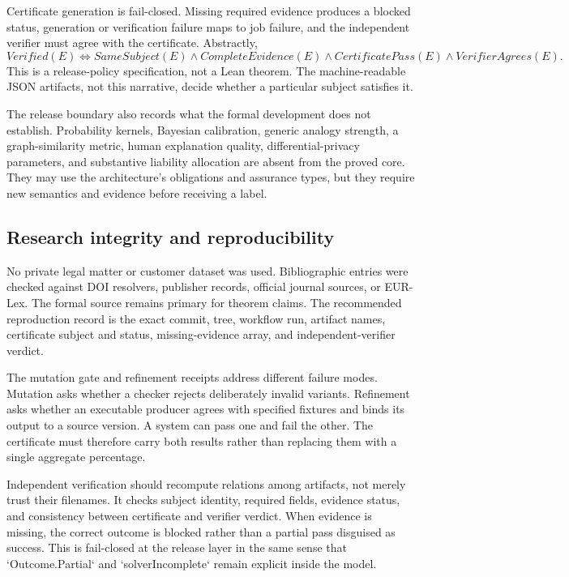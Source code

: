 Certificate generation is fail-closed. Missing required evidence produces a blocked status, generation or verification failure maps to job failure, and the independent verifier must agree with the certificate. Abstractly,
\begin{equation}
Verified(E)\iff SameSubject(E)\land CompleteEvidence(E)
\land CertificatePass(E)\land VerifierAgrees(E).
\label{eq:verified-release}
\end{equation}
This is a release-policy specification, not a Lean theorem. The machine-readable JSON artifacts, not this narrative, decide whether a particular subject satisfies it.

The release boundary also records what the formal development does not establish. Probability kernels, Bayesian calibration, generic analogy strength, a graph-similarity metric, human explanation quality, differential-privacy parameters, and substantive liability allocation are absent from the proved core. They may use the architecture's obligations and assurance types, but they require new semantics and evidence before receiving a \formalized{} label.

\subsection{Research integrity and reproducibility}

No private legal matter or customer dataset was used. Bibliographic entries were checked against DOI resolvers, publisher records, official journal sources, or EUR-Lex. The formal source remains primary for theorem claims. The recommended reproduction record is the exact commit, tree, workflow run, artifact names, certificate subject and status, missing-evidence array, and independent-verifier verdict.

The mutation gate and refinement receipts address different failure modes. Mutation asks whether a checker rejects deliberately invalid variants. Refinement asks whether an executable producer agrees with specified fixtures and binds its output to a source version. A system can pass one and fail the other. The certificate must therefore carry both results rather than replacing them with a single aggregate percentage.

Independent verification should recompute relations among artifacts, not merely trust their filenames. It checks subject identity, required fields, evidence status, and consistency between certificate and verifier verdict. When evidence is missing, the correct outcome is blocked rather than a partial pass disguised as success. This is fail-closed at the release layer in the same sense that `Outcome.Partial` and `solverIncomplete` remain explicit inside the model.

